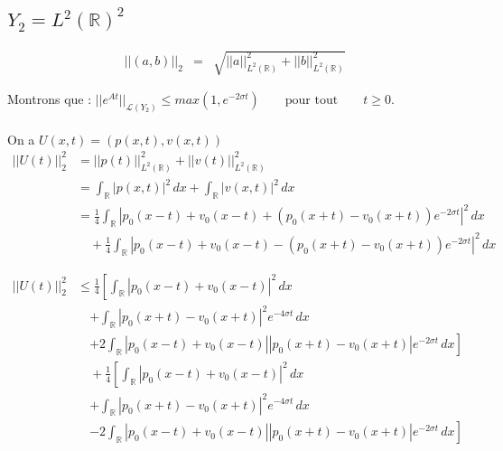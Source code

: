 \documentclass[a4paper,11pt]{article}
\begin{document}
\subsection{\( Y_{2} = L^{2}(\mathbb{R})^{2} \)}

\begin{equation*}
\begin{array}{rcl}
    ||(a,b)||_{2} &=& \sqrt{||a||^{2}_{L^{2}(\mathbb{R})} + ||b||^{2}_{L^{2}(\mathbb{R})}}
\end{array}
\end{equation*}

Montrons que :
\( ||e^{At}||_{\mathcal{L}(Y_2)}\leq max(1, e^{-2\sigma t}) \qquad \mbox{pour tout} \qquad t\geq 0. \)\\ \\
On a \( U(x,t)=(p(x,t),v(x,t)) \) \\

\begin{equation*}
\begin{split}
    ||U(t)||^{2}_{2} &= ||p(t)||^{2}_{L^{2}(\mathbb{R})} + ||v(t)||^{2}_{L^{2}(\mathbb{R})} \\
    &= \int_{\mathbb{R}}{|p(x,t)|^{2}\,dx} + \int_{\mathbb{R}}{|v(x,t)|^{2}\,dx} \\
    &= \frac{1}{4} \int_{\mathbb{R}} |p_0(x-t)+v_0(x-t) + (p_0(x+t)-v_0(x+t)) e^{-2\sigma t} |^{2} \,dx \\
    & \quad +\frac{1}{4} \int_{\mathbb{R}} |p_0(x-t) + v_0(x-t) - (p_0(x+t) - v_0(x+t)) e^{-2\sigma t}|^{2} \,dx 
\end{split}
\end{equation*}

\begin{equation*}
\begin{split}
    ||U(t)||^{2}_{2} & \le \frac{1}{4} \left[ \int_{\mathbb{R}}|p_0(x-t) + v_0(x-t)|^{2} \,dx \right. \\
   & \quad \left. + \int_{\mathbb{R}} |p_0(x+t) - v_0(x+t)|^{2}  e^{-4\sigma t} \,dx \right. \\
   & \quad \left. + 2 \int_{\mathbb{R}} |p_0(x-t) + v_0(x-t)| |p_0(x+t) - v_0(x+t)| e^{-2\sigma t} \,dx \right] \\
   & \quad + \frac{1}{4} \left[ \int_{\mathbb{R}}|p_0(x-t) + v_0(x-t)|^{2} \,dx \right. \\
   & \quad \left. + \int_{\mathbb{R}} |p_0(x+t) - v_0(x+t)|^{2}  e^{-4\sigma t} \,dx \right. \\
   & \quad \left. - 2 \int_{\mathbb{R}} |p_0(x-t) + v_0(x-t)| |p_0(x+t) - v_0(x+t)| e^{-2\sigma t} \,dx \right]
\end{split}
\end{equation*}
\end{document}
